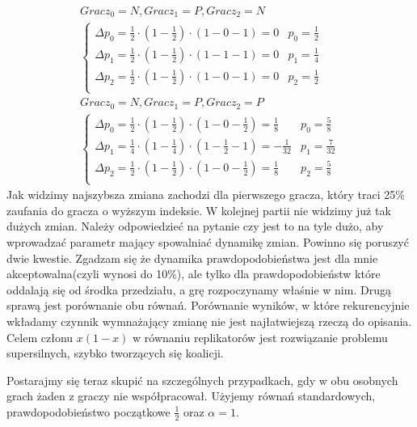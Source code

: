 \begin{align*}
Gracz_0 = N, Gracz_1 = P, Gracz_2 = N \\
\left\{
\begin{array}{ll}
\Delta p_0 = \frac{1}{2} \cdot (1 - \frac{1}{2}) \cdot (1 - 0 - 1) =  0 & p_0=\frac{1}{2}\\
\Delta p_1 = \frac{1}{2} \cdot (1 - \frac{1}{2}) \cdot (1 - 1 - 1) =  0 & p_1= \frac{1}{4}\\
\Delta p_2 = \frac{1}{2} \cdot (1 - \frac{1}{2}) \cdot (1 - 0 - 1) =  0 & p_2=\frac{1}{2}\\
\end{array} 
\right.
\\
Gracz_0 = N, Gracz_1 = P, Gracz_2 = P \\
\left\{
\begin{array}{ll}
\Delta p_0 = \frac{1}{2} \cdot (1 - \frac{1}{2}) \cdot (1 - 0 - \frac{1}{2}) = \frac{1}{8} & p_0=\frac{5}{8}\\
\Delta p_1 = \frac{1}{4} \cdot (1 - \frac{1}{4}) \cdot (1 - \frac{1}{2} - 1) = -\frac{1}{32} & p_1= \frac{7}{32}\\
\Delta p_2 = \frac{1}{2} \cdot (1 - \frac{1}{2}) \cdot (1 - 0 - \frac{1}{2}) = \frac{1}{8}  & p_2=\frac{5}{8}\\
\end{array}
\right.
\end{align*}
Jak widzimy najszybsza zmiana zachodzi dla pierwszego gracza, który traci 25\% zaufania do gracza o wyższym indeksie. W kolejnej partii nie widzimy już tak dużych zmian. Należy odpowiedzieć na pytanie czy jest to na tyle dużo, aby wprowadzać parametr mający spowalniać dynamikę zmian. Powinno się poruszyć dwie kwestie. Zgadzam się że dynamika prawdopodobieństwa jest dla mnie akceptowalna(czyli wynosi do 10\%), ale tylko dla prawdopodobieństw które oddalają się od środka przedziału, a grę rozpoczynamy właśnie w nim. Drugą sprawą jest porównanie obu równań. Porównanie wyników, w które rekurencyjnie wkładamy czynnik wymnażający zmianę nie jest najłatwiejszą rzeczą do opisania. Celem członu $x(1-x)$ w równaniu replikatorów jest rozwiązanie problemu supersilnych, szybko tworzących się koalicji.

Postarajmy się teraz skupić na szczególnych przypadkach, gdy w obu osobnych grach żaden z graczy nie współpracował. Użyjemy równań standardowych, prawdopodobieństwo początkowe $\frac{1}{2}$ oraz $\alpha = 1$.

